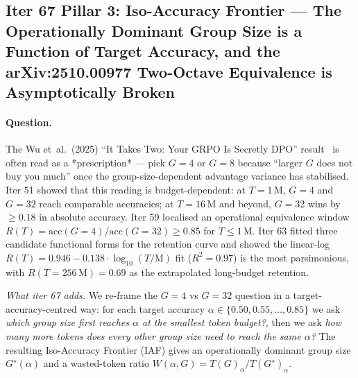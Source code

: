 \subsection{Iter 67 Pillar 3: Iso-Accuracy Frontier --- The Operationally Dominant Group Size is a Function of Target Accuracy, and the arXiv:2510.00977 Two-Octave Equivalence is Asymptotically Broken}
\label{sec:group-size-iter67}

\paragraph{Question.}
The Wu et~al.\ (2025) ``It Takes Two: Your GRPO Is Secretly DPO''
result~\citep{wu2025grpo_dpo} is often read as a *prescription* --- pick
$G{=}4$ or $G{=}8$ because ``larger $G$ does not buy you much'' once
the group-size-dependent advantage variance has stabilised.  Iter 51
showed that this reading is budget-dependent: at $T{=}1\,\mathrm{M}$,
$G{=}4$ and $G{=}32$ reach comparable accuracies; at $T{=}16\,\mathrm{M}$
and beyond, $G{=}32$ wins by $\ge 0.18$ in absolute accuracy.
Iter 59 localised an operational equivalence window
$R(T) = \mathrm{acc}(G{=}4)/\mathrm{acc}(G{=}32) \ge 0.85$
for $T \le 1\,\mathrm{M}$.  Iter 63 fitted three candidate
functional forms for the retention curve and showed the linear-log
$R(T) = 0.946 - 0.138 \cdot \log_{10}(T/\mathrm{M})$ fit
($R^2 = 0.97$) is the most parsimonious, with $R(T{=}256\,\mathrm{M}) =
0.69$ as the extrapolated long-budget retention.

\noindent\textit{What iter 67 adds.}  We re-frame the $G{=}4$ vs
$G{=}32$ question in a target-accuracy-centred way: for each target
accuracy $\alpha \in \{0.50, 0.55, \dots, 0.85\}$ we ask
\emph{which group size first reaches $\alpha$ at the smallest token
budget?}, then we ask \emph{how many more tokens does every other
group size need to reach the same $\alpha$?}  The resulting
Iso-Accuracy Frontier (IAF) gives an operationally dominant
group size $G^\star(\alpha)$ and a wasted-token ratio
$W(\alpha, G) = T(G)_\alpha / T(G^\star)_\alpha$.

